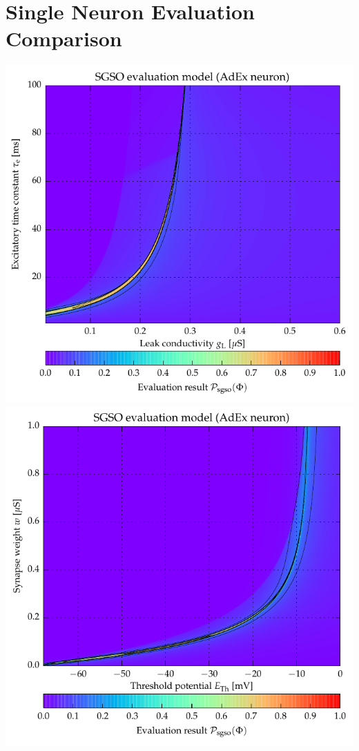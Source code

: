 \chapter{Single Neuron Evaluation Comparison}
\label{app:evaluation_measure_comparison}

{\begingroup

\raggedleft
\includegraphics[trim=0cm 1.75cm 0cm 0cm,clip]{media/appC/i9_ex_sc1_SgSo_XgL_YtauE_pSoft_SgSo_AdIfCondExp.pdf}\\
\vspace{0.5cm}
\includegraphics[trim=0cm 0cm 0cm 0.1cm,clip]{media/appC/i19_ex_sc1_SgSo_XeTh_Yw_pSoft_SgSo_AdIfCondExp.pdf}

}
